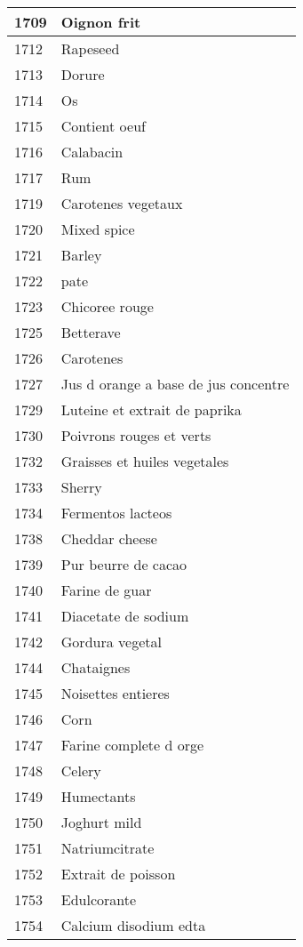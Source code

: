 \begin{longtable}{|l|l|}
1709 & Oignon frit \\ \hline 
1712 & Rapeseed \\ \hline 
1713 & Dorure \\ \hline 
1714 & Os \\ \hline 
1715 & Contient oeuf \\ \hline 
1716 & Calabacin \\ \hline 
1717 & Rum \\ \hline 
1719 & Carotenes vegetaux \\ \hline 
1720 & Mixed spice \\ \hline 
1721 & Barley \\ \hline 
1722 & pate \\ \hline 
1723 & Chicoree rouge \\ \hline 
1725 & Betterave \\ \hline 
1726 & Carotenes \\ \hline 
1727 & Jus d orange a base de jus concentre \\ \hline 
1729 & Luteine et extrait de paprika \\ \hline 
1730 & Poivrons rouges et verts \\ \hline 
1732 & Graisses et huiles vegetales \\ \hline 
1733 & Sherry \\ \hline 
1734 & Fermentos lacteos \\ \hline 
1738 & Cheddar cheese \\ \hline 
1739 & Pur beurre de cacao \\ \hline 
1740 & Farine de guar \\ \hline 
1741 & Diacetate de sodium \\ \hline 
1742 & Gordura vegetal \\ \hline 
1744 & Chataignes \\ \hline 
1745 & Noisettes entieres \\ \hline 
1746 & Corn \\ \hline 
1747 & Farine complete d orge \\ \hline 
1748 & Celery \\ \hline 
1749 & Humectants \\ \hline 
1750 & Joghurt mild \\ \hline 
1751 & Natriumcitrate \\ \hline 
1752 & Extrait de poisson \\ \hline 
1753 & Edulcorante \\ \hline 
1754 & Calcium disodium edta \\ \hline 

\end{longtable}
